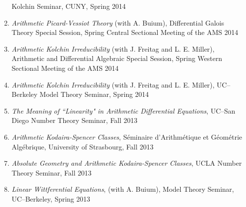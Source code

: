 \documentclass[a4paper,10pt]{article}
\begin{document}
\begin{enumerate}
	Kolchin Seminar, CUNY, Spring 2014
	\item \emph{Arithmetic Picard-Vessiot Theory} (with A. Buium),
	Differential Galois Theory Special Session, Spring Central Sectional Meeting of the AMS 2014
	\item \emph{Arithmetic Kolchin Irreducibility} (with J. Freitag and L. E. Miller), 
	Arithmetic and Differential Algebraic Special Session, Spring Western Sectional Meeting of the AMS 2014
	\item \emph{Arithmetic Kolchin Irreducibility} (with J. Freitag and L. E. Miller), UC--Berkeley Model Theory Seminar, Spring 2014
	\item \emph{The Meaning of ``Linearity" in Arithmetic Differential Equations}, UC--San Diego Number Theory Seminar, Fall 2013
	\item \emph{Arithmetic Kodaira-Spencer Classes}, S\'eminaire d'Arithm\'etique et G\'eom\'etrie Alg\'ebrique, University of Strasbourg, Fall 2013
	\item \emph{Absolute Geometry and Arithmetic Kodaira-Spencer Classes}, UCLA Number Theory Seminar, Fall 2013
	\item \emph{Linear Wittferential Equations}, (with A. Buium), Model Theory Seminar, UC--Berkeley, Spring 2013
\end{enumerate}
\end{document}
